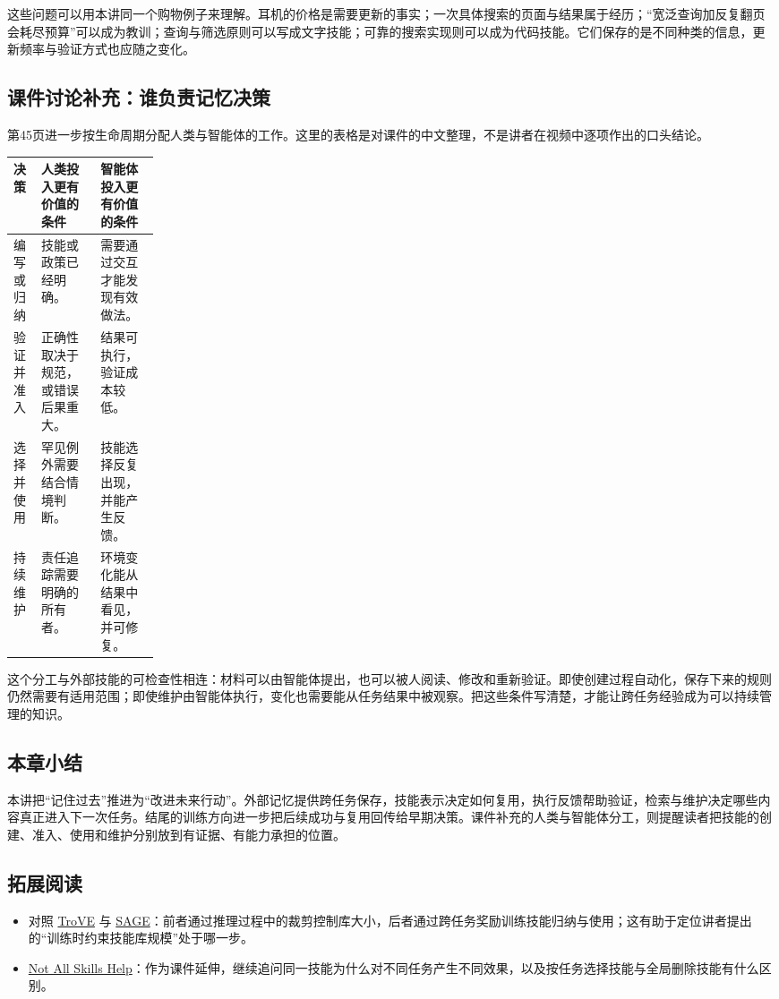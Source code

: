 \documentclass[11pt,a4paper]{article}
\begin{document}
这些问题可以用本讲同一个购物例子来理解。耳机的价格是需要更新的事实；一次具体搜索的页面与结果属于经历；“宽泛查询加反复翻页会耗尽预算”可以成为教训；查询与筛选原则可以写成文字技能；可靠的搜索实现则可以成为代码技能。它们保存的是不同种类的信息，更新频率与验证方式也应随之变化。

\subsection{课件讨论补充：谁负责记忆决策}

第45页进一步按生命周期分配人类与智能体的工作。这里的表格是对课件的中文整理，不是讲者在视频中逐项作出的口头结论。

\begin{center}
\small
\begin{tabularx}{\linewidth}{@{}p{0.19\linewidth}XX@{}}
\toprule
决策 & 人类投入更有价值的条件 & 智能体投入更有价值的条件\\
\midrule
编写或归纳 & 技能或政策已经明确。 & 需要通过交互才能发现有效做法。\\
验证并准入 & 正确性取决于规范，或错误后果重大。 & 结果可执行，验证成本较低。\\
选择并使用 & 罕见例外需要结合情境判断。 & 技能选择反复出现，并能产生反馈。\\
持续维护 & 责任追踪需要明确的所有者。 & 环境变化能从结果中看见，并可修复。\\
\bottomrule
\end{tabularx}
\end{center}

这个分工与外部技能的可检查性相连：材料可以由智能体提出，也可以被人阅读、修改和重新验证。即使创建过程自动化，保存下来的规则仍然需要有适用范围；即使维护由智能体执行，变化也需要能从任务结果中被观察。把这些条件写清楚，才能让跨任务经验成为可以持续管理的知识。

\subsection{本章小结}

本讲把“记住过去”推进为“改进未来行动”。外部记忆提供跨任务保存，技能表示决定如何复用，执行反馈帮助验证，检索与维护决定哪些内容真正进入下一次任务。结尾的训练方向进一步把后续成功与复用回传给早期决策。课件补充的人类与智能体分工，则提醒读者把技能的创建、准入、使用和维护分别放到有证据、有能力承担的位置。

\subsection{拓展阅读}

\begin{itemize}
\item 对照 \href{https://arxiv.org/abs/2401.12869}{TroVE} 与 \href{https://aclanthology.org/2026.acl-long.69/}{SAGE}：前者通过推理过程中的裁剪控制库大小，后者通过跨任务奖励训练技能归纳与使用；这有助于定位讲者提出的“训练时约束技能库规模”处于哪一步。
\item \href{https://arxiv.org/abs/2606.15390}{Not All Skills Help}：作为课件延伸，继续追问同一技能为什么对不同任务产生不同效果，以及按任务选择技能与全局删除技能有什么区别。
\end{itemize}
\end{document}
